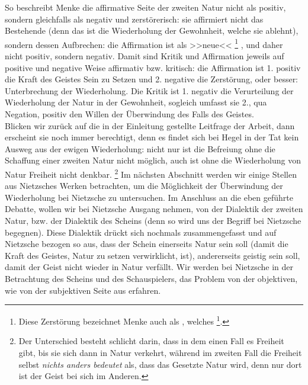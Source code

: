 \documentclass[12pt, a4paper, openany]{report}
\begin{document}
So beschreibt Menke die affirmative Seite der zweiten Natur nicht als positiv, sondern gleichfalls als negativ und zerstörerisch:
sie affirmiert nicht das Bestehende (denn das ist die Wiederholung der Gewohnheit, welche sie ablehnt), sondern dessen Aufbrechen: 
die Affirmation ist als >>neue<< %
\footnote{
    \cite[][S. 148. Hervorhebung von mir.]{menke_autonomie_2018}
    Diese Zerstörung bezeichnet Menke auch als , welches \footcite[][147]{menke_autonomie_2018}.
}%
, und daher nicht positiv, sondern negativ.
Damit sind Kritik und Affirmation jeweils auf positive und negative Weise affirmativ bzw. kritisch:
die Affirmation ist 1. positiv die Kraft des Geistes Sein zu Setzen und 2. negative die Zerstörung, oder besser: 
Unterbrechung der Wiederholung. 
Die Kritik ist 1. negativ die Verurteilung der Wiederholung der Natur in der Gewohnheit, sogleich umfasst sie 2., qua Negation, positiv den Willen der Überwindung des Falls des Geistes.\\

Blicken wir zurück auf die in der Einleitung gestellte Leitfrage der Arbeit, dann erscheint sie noch immer berechtigt, denn es findet sich bei Hegel in der Tat kein Ausweg aus der ewigen Wiederholung:
nicht nur ist die Befreiung ohne die Schaffung einer zweiten Natur nicht möglich, auch ist ohne die Wiederholung von Natur Freiheit nicht denkbar.%
\footnote{
    Der Unterschied besteht schlicht darin, dass in dem einen Fall es Freiheit  gibt, bis sie sich dann in Natur verkehrt, während im zweiten Fall die Freiheit selbst \emph{nichts anders bedeutet} als, dass das Gesetzte Natur wird, denn nur dort ist der Geist bei sich im Anderen.
}
Im nächsten Abschnitt werden wir einige Stellen aus Nietzsches Werken betrachten, um die Möglichkeit der Überwindung der Wiederholung bei Nietzsche zu untersuchen.
Im Anschluss an die eben geführte Debatte, wollen wir bei Nietzsche Ausgang nehmen, von der Dialektik der zweiten Natur, bzw. der Dialektik des Scheins (denn so wird uns der Begriff bei Nietzsche begegnen).
Diese Dialektik drückt sich nochmals zusammengefasst und auf Nietzsche bezogen so aus, dass der Schein einerseits Natur sein soll (damit die Kraft des Geistes, Natur zu setzen verwirklicht, ist), andererseits geistig sein soll, damit der Geist nicht wieder in Natur verfällt. 
Wir werden bei Nietzsche in der Betrachtung des Scheins und des Schauspielers, das Problem von der objektiven, wie von der subjektiven Seite aus erfahren. 
\end{document}
